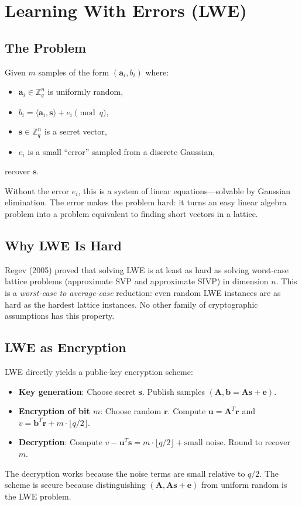 \section{Learning With Errors (LWE)}


\subsection{The Problem}

\begin{definition}
Given $m$ samples of the form $(\mathbf{a}_i, b_i)$ where:
\begin{itemize}[nosep]
  \item $\mathbf{a}_i \in \mathbb{Z}_q^n$ is uniformly random,
  \item $b_i = \langle \mathbf{a}_i, \mathbf{s} \rangle + e_i \pmod{q}$,
  \item $\mathbf{s} \in \mathbb{Z}_q^n$ is a secret vector,
  \item $e_i$ is a small ``error'' sampled from a discrete Gaussian,
\end{itemize}
recover $\mathbf{s}$.
\end{definition}

Without the error $e_i$, this is a system of linear equations---solvable by Gaussian
elimination. The error makes the problem hard: it turns an easy linear algebra problem
into a problem equivalent to finding short vectors in a lattice.

\subsection{Why LWE Is Hard}

Regev (2005) proved that solving LWE is at least as hard as solving worst-case lattice
problems (approximate SVP and approximate SIVP) in dimension $n$. This is a
\emph{worst-case to average-case} reduction: even random LWE instances are as hard as
the hardest lattice instances. No other family of cryptographic assumptions has this
property.

\subsection{LWE as Encryption}

LWE directly yields a public-key encryption scheme:

\begin{itemize}[nosep]
  \item \textbf{Key generation}: Choose secret $\mathbf{s}$. Publish samples
    $(\mathbf{A}, \mathbf{b} = \mathbf{A}\mathbf{s} + \mathbf{e})$.
  \item \textbf{Encryption of bit $m$}: Choose random $\mathbf{r}$. Compute
    $\mathbf{u} = \mathbf{A}^T \mathbf{r}$ and $v = \mathbf{b}^T \mathbf{r} + m \cdot \lfloor q/2 \rfloor$.
  \item \textbf{Decryption}: Compute $v - \mathbf{u}^T \mathbf{s} = m \cdot \lfloor q/2 \rfloor + \text{small noise}$.
    Round to recover $m$.
\end{itemize}

The decryption works because the noise terms are small relative to $q/2$. The scheme is
secure because distinguishing $(\mathbf{A}, \mathbf{A}\mathbf{s} + \mathbf{e})$ from
uniform random is the LWE problem.

